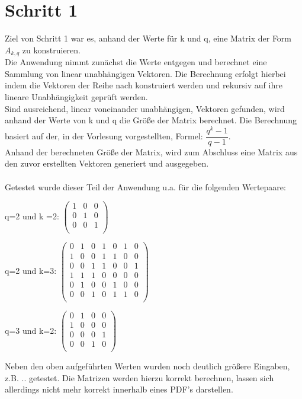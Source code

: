 \section{Schritt 1}
Ziel von Schritt 1 war es, anhand der Werte für k und q, eine Matrix der Form $A_{k,q}$ zu konstruieren. \\
Die Anwendung nimmt zunächst die Werte  entgegen und berechnet eine Sammlung von linear unabhängigen Vektoren. Die Berechnung erfolgt hierbei indem die Vektoren der Reihe nach konstruiert werden und rekursiv auf ihre lineare Unabhängigkeit geprüft werden.\\
Sind ausreichend, linear voneinander unabhängigen, Vektoren gefunden, wird anhand der Werte von k und q die Größe der Matrix berechnet. Die Berechnung basiert auf der, in der Vorlesung vorgestellten, Formel: $\dfrac{q^{k}-1}{q-1}$. \\
Anhand der berechneten Größe der Matrix, wird zum Abschluss eine Matrix aus den zuvor erstellten Vektoren generiert und ausgegeben.\\
\\
Getestet wurde dieser Teil der Anwendung u.a. für die folgenden Wertepaare:

\begin{description}
	\item
	q=2 und k =2:
	$
		\begin{pmatrix}
			1 & 0 & 0 \\
			0 & 1 & 0 \\
			0 & 0 & 1 \\
		\end{pmatrix}
	$
	\item
	q=2 und k=3:			
	$
	\begin{pmatrix}
		0 & 1 & 0 & 1 & 0 & 1 & 0 \\
		1 & 0 & 0 & 1 & 1 & 0 & 0 \\
		0 & 0 & 1 & 1 & 0 & 0 & 1 \\
		1 & 1 & 1 & 0 & 0 & 0 & 0 \\
		0 & 1 & 0 & 0 & 1 & 0 & 0 \\
		0 & 0 & 1 & 0 & 1 & 1 & 0 \\
	\end{pmatrix}
	$ 
	\item 
	q=3 und k=2: 
	$
	\begin{pmatrix}
		0 & 1 & 0 & 0 \\
		1 & 0 & 0 & 0 \\
		0 & 0 & 0 & 1 \\
		0 & 0 & 1 & 0 \\		
	\end{pmatrix}
	$
\end{description}
Neben den oben aufgeführten Werten wurden noch deutlich größere Eingaben, z.B. .. getestet. Die Matrizen werden hierzu korrekt berechnen, lassen sich allerdings nicht mehr korrekt innerhalb eines PDF's darstellen.